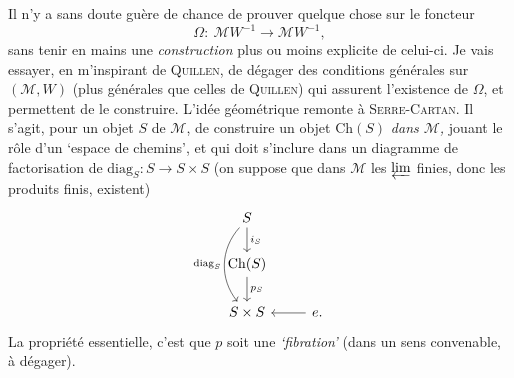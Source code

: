 Il n'y a sans doute guère de chance de prouver quelque chose sur le foncteur
\[
\Omega :\ \mathcal{M}W^{-1} \longrightarrow \mathcal{M}W^{-1},
\]
sans tenir en mains une \textit{construction} plus ou moins explicite de celui-ci. Je vais essayer, en m'inspirant de \textsc{Quillen}, de dégager des conditions générales sur $(\mathcal{M}, W)$ (plus générales que celles de \textsc{Quillen}) qui assurent l'existence de $\Omega$, et permettent de le construire. L'idée géométrique remonte à \textsc{Serre-Cartan}. Il s'agit, pour un objet $S$ de $\mathcal{M}$, de construire un objet $\mathrm{Ch}(S)$ \textit{dans $\mathcal{M}$,} jouant le rôle d'un `espace de chemins', et qui doit s'inclure dans un diagramme de factorisation de $\mathrm{diag}_S : S \longrightarrow S \times S$ (on suppose que dans $\mathcal{M}$ les $\varprojlim$ finies, donc les produits finis, existent)
\[
\begin{tikzcd}
S \arrow[d, "i_S"] \arrow[dd, bend right=40, "\mathrm{diag}_S"'] & \\
\mathrm{Ch}(S) \arrow[d, "p_S"] & \\
S \times S & e. \arrow[l]
\end{tikzcd}
\]
La propriété essentielle, c'est que $p$ soit une \textit{`fibration'} (dans un sens convenable, à dégager).

